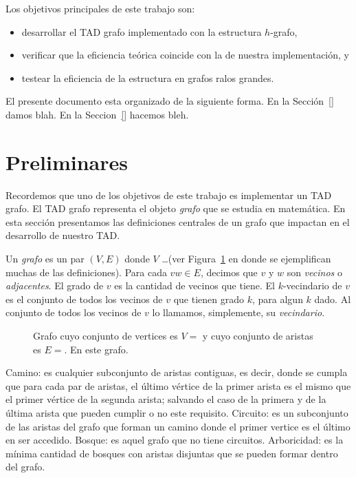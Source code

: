 \documentclass[a4paper,12pt]{article}
\begin{document}
Los objetivos principales de este trabajo son:
\begin{itemize}
  \item desarrollar el TAD grafo implementado con la estructura $h$-grafo,
  \item verificar que la eficiencia teórica coincide con la de nuestra implementación, y
  \item testear la eficiencia de la estructura en grafos ralos grandes.
\end{itemize}

El presente documento esta organizado de la siguiente forma.  En la Sección~\ref{} damos blah.  En la Seccion~\ref{} hacemos bleh.

\section{Preliminares}
\label{sec:definiciones}

Recordemos que uno de los objetivos de este trabajo es implementar un TAD grafo.  El TAD grafo representa el objeto \emph{grafo} que se estudia en matemática.  En esta sección presentamos las definiciones centrales de un grafo que impactan en el desarrollo de nuestro TAD.

Un \emph{grafo} es un par $(V, E)$ donde $V$ \ldots (ver Figura~\ref{fig:definiciones} en donde se ejemplifican muchas de las definiciones).  Para cada $vw \in E$, decimos que $v$ y $w$ son \emph{vecinos} o \emph{adjacentes}.  El grado de $v$ es la cantidad de vecinos que tiene.  El $k$-vecindario de $v$ es el conjunto de todos los vecinos de $v$ que tienen grado $k$, para algun $k$ dado.  Al conjunto de todos los vecinos de $v$ lo llamamos, simplemente, su \emph{vecindario}.

\begin{figure}
  \centering

  \caption{Grafo cuyo conjunto de vertices es $V = $ y cuyo conjunto de aristas es $E =$.  En este grafo.}\label{fig:definiciones}
\end{figure}


Camino: es cualquier subconjunto de aristas contiguas, es decir, donde se cumpla que para cada par de aristas, el último vértice de la primer arista es el mismo que el primer vértice de la segunda arista; salvando el caso de la primera y de la última arista que pueden cumplir o no este requisito.  Circuito: es un subconjunto de las aristas del grafo que forman un camino donde el primer vertice es el último en ser accedido.  Bosque: es aquel grafo que no tiene circuitos.  Arboricidad: es la mínima cantidad de bosques con aristas disjuntas que se pueden formar dentro del grafo.
\end{document}
